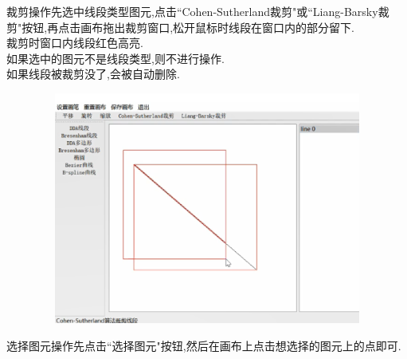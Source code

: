 \documentclass[a4paper,UTF8]{article}
\theoremstyle{definition}
\begin{document}
裁剪操作先选中线段类型图元,点击``Cohen-Sutherland裁剪"或``Liang-Barsky裁剪"按钮,再点击画布拖出裁剪窗口,松开鼠标时线段在窗口内的部分留下.\\
\indent 裁剪时窗口内线段红色高亮.\\
\indent 如果选中的图元不是线段类型,则不进行操作.\\
\indent 如果线段被裁剪没了,会被自动删除.
\begin{figure}[H]
	\includegraphics[width=5in,height=3in]{clip.png}
\end{figure}
选择图元操作先点击``选择图元"按钮,然后在画布上点击想选择的图元上的点即可.
\end{document}
